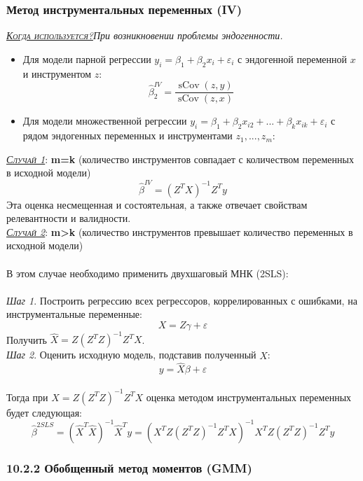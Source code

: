 \documentclass[a0,final]{a0poster}
\DeclareMathOperator{\sCov}{sCov}
\DeclareMathOperator{\E}{E}
\DeclareMathOperator*{\plim}{plim}
\begin{document}
\begin{multicols}{4}
\subsubsection*{\textbf{Метод инструментальных переменных (IV)}}
\underline{\textsc{\textit{Когда используется?}}}\textit{При возникновении проблемы эндогенности.}\\
\begin{itemize}
\item Для модели парной регрессии $y_i = \beta_1 + \beta_2x_i + \varepsilon_i$ с эндогенной переменной $x$ и инструментом $z$:
$$\hat{\beta}_2^{IV} = \frac{\sCov(z,y)}{\sCov(z,x)}$$

\item Для модели множественной регрессии  $y_i = \beta_1 + \beta_2x_{i2} + ... + \beta_kx_{ik} + \varepsilon_i$ с рядом эндогенных переменных и инструментами $z_1,...,z_m$: \\
\end{itemize}
\underline{\textsc{\textit{Случай 1}}}: \textbf{m=k} (количество инструментов совпадает с количеством переменных в исходной модели)
$$\hat{\beta}^{IV} = ({Z^TX})^{-1}Z^Ty$$
Эта оценка несмещенная и состоятельная, а также отвечает свойствам релевантности и валидности. \\

\underline{\textsc{\textit{Случай 2}}}: \textbf{m>k} (количество инструментов превышает количество переменных в исходной модели) \\
\\
В этом случае необходимо применить двухшаговый МНК (2SLS): \\
\\
\textit{Шаг 1}. Построить регрессию всех регрессоров, коррелированных с ошибками, на инструментальные переменные:
$$X=Z\gamma + \varepsilon$$
Получить $\hat{X}=Z({Z^TZ})^{-1}Z^TX$.\\
\textit{Шаг 2}. Оценить исходную модель, подставив полученный $\hat{X}$: $$y=\hat{X}\beta+\varepsilon$$ \\
Тогда при $\hat{X}=Z({Z^TZ})^{-1}Z^TX$ оценка методом инструментальных переменных будет следующая:
$$\hat{\beta}^{2SLS}=({\hat{X}^T\hat{X}})^{-1}\hat{X}^Ty = ({X^TZ({Z^TZ})^{-1}Z^TX})^{-1}{X^TZ({Z^TZ})^{-1}Z^Ty}$$

\subsubsection*{\textbf{10.2.2 Обобщенный метод моментов (GMM)}}


\end{multicols}
\end{document}
